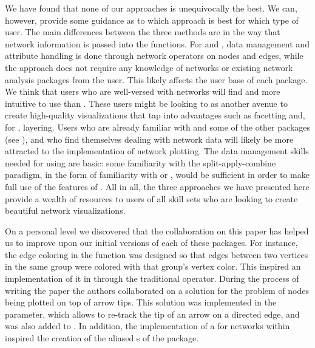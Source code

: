 We have found that none of our approaches is unequivocally the best. We can, however, provide some guidance as to which approach is best for which type of user. The main differences between the three methods are in the way that network information is passed into the functions. For  and , data management and attribute handling is done through network operators on nodes and edges, while the  approach does not require any knowledge of networks or existing network analysis packages from the user. This likely affects the user base of each package. We think that users who are well-versed with networks will find  and  more intuitive to use than . These users might be looking to  as another avenue to create high-quality visualizations that tap into  advantages such as facetting and, for , layering. Users who are already familiar with  and some of the other  packages (see \citet{tidyverse}), and who find themselves dealing with network data will likely be more attracted to the  implementation of network plotting. The data management skills needed for using  are basic: some familiarity with the split-apply-combine paradigm, in the form of familiarity with  or , would be sufficient in order to make full use of the features of  \citep{plyr}. All in all, the three approaches we have presented here provide a wealth of resources to users of all skill sets who are looking to create beautiful network visualizations.

On a personal level we discovered that the collaboration on this paper has helped us to improve upon our initial versions of each of these packages. For instance, the edge coloring in the  function was designed so that edges between two vertices in the same group were colored with that group's vertex color. This  inspired an implementation of it in  through the traditional   operator. During the process of writing the paper the authors collaborated on a solution for the problem of nodes being plotted on top of arrow tips. This solution  was implemented in the   parameter, which allows to re-track the tip of an arrow on a directed edge, and was also added to . In addition, the implementation of a   for networks within  inspired the creation of the aliased s of the  package. 

